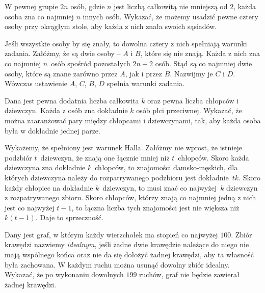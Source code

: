 \newpage
{}

\begin{problem}{1}
	W pewnej grupie $2n$ osób, gdzie $n$ jest liczbą całkowitą nie mniejszą od $2$, każda osoba zna co najmniej $n$ innych osób. Wykazać, że możemy usadzić pewne cztery osoby przy okrągłym stole, aby każda z nich znała swoich sąsiadów.
\end{problem}

\noindent
Jeśli wszystkie osoby by się znały, to dowolna cztery z nich spełniają warunki zadania. Załóżmy, że są dwie osoby -- $A$ i $B$, które się nie znają. Każda z nich zna co najmniej $n$~osób spośród pozostałych $2n - 2$ osób. Stąd są co najmniej dwie osoby, które są znane zarówno przez $A$, jak i przez $B$. Nazwijmy je $C$ i $D$. Wówczas ustawienie $A$, $C$, $B$, $D$ spełnia warunki zadania. 

\vspace{5px}

\begin{problem}{2}
	Dana jest pewna dodatnia liczba całkowita $k$ oraz pewna liczba chłopców i dziewczyn. Każda z osób zna dokładnie $k$ osób płci przeciwnej. Wykazać, że można zaaranżować pary między chłopcami i dziewczynami, tak, aby każda osoba była w dokładnie jednej parze.
\end{problem}

\noindent
Wykażemy, że spełniony jest warunek Halla. Załóżmy nie wprost, że istnieje podzbiór $t$~dziewczyn, że znają one łącznie mniej niż $t$~chłopców. Skoro każda dziewczyna zna dokładnie $k$~chłopców, to znajomości damsko-męskich, dla których dziewczyna należy do rozpatrywanego podzbioru jest dokładnie~$tk$. Skoro każdy chłopiec na dokładnie $k$~dziewczyn, to musi znać co najwyżej~$k$ dziewczyn z rozpatrywanego zbioru. Skoro chłopców, którzy znają co najmniej jedną z nich jest co najwyżej $t - 1$, to łączna liczba tych znajomości jest nie większa niż $k(t - 1)$. Daje to sprzeczność.

\vspace{5px}

\begin{problem}{3}
	Dany jest graf, w którym każdy wierzchołek ma stopień co najwyżej $100$. Zbiór krawędzi nazwiemy \textit{idealnym}, jeśli żadne dwie krawędzie należące do niego nie mają wspólnego końca oraz nie da się dołożyć żadnej krawędzi, aby ta własność była zachowana. W każdym ruchu można usunąć dowolny zbiór idealny. Wykazać, że po wykonaniu dowolnych $199$ ruchów, graf nie będzie zawierał żadnej krawędzi.
\end{problem}

